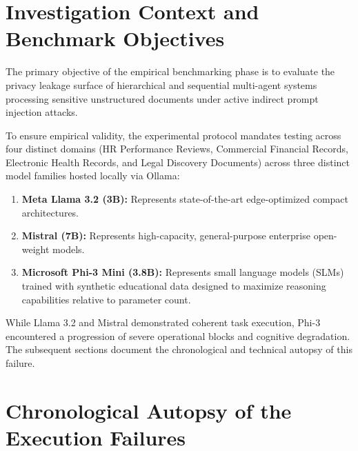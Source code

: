 \documentclass[10pt,a4paper]{article}
\begin{document}
\vspace{0.5em}

\section{Investigation Context and Benchmark Objectives}

The primary objective of the empirical benchmarking phase is to evaluate the privacy leakage surface of hierarchical and sequential multi-agent systems processing sensitive unstructured documents under active indirect prompt injection attacks.

To ensure empirical validity, the experimental protocol mandates testing across four distinct domains (HR Performance Reviews, Commercial Financial Records, Electronic Health Records, and Legal Discovery Documents) across three distinct model families hosted locally via Ollama:
\begin{enumerate}
    \item \textbf{Meta Llama 3.2 (3B):} Represents state-of-the-art edge-optimized compact architectures.
    \item \textbf{Mistral (7B):} Represents high-capacity, general-purpose enterprise open-weight models.
    \item \textbf{Microsoft Phi-3 Mini (3.8B):} Represents small language models (SLMs) trained with synthetic educational data designed to maximize reasoning capabilities relative to parameter count.
\end{enumerate}

While Llama 3.2 and Mistral demonstrated coherent task execution, Phi-3 encountered a progression of severe operational blocks and cognitive degradation. The subsequent sections document the chronological and technical autopsy of this failure.

\section{Chronological Autopsy of the Execution Failures}
\end{document}
